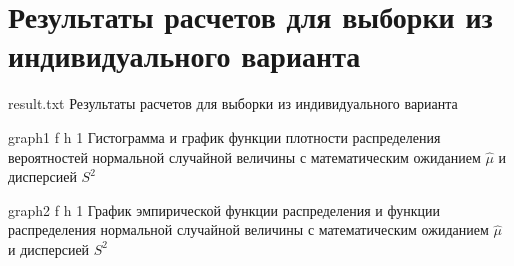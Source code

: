 \chapter{Результаты расчетов для выборки из индивидуального варианта}

{result.txt} %
{Результаты расчетов для выборки из индивидуального варианта} %

{graph1} %
{f} %
{h} %
{1\textwidth} %
{Гистограмма и график функции плотности распределения вероятностей нормальной случайной величины с математическим ожиданием $\hat{\mu}$ и дисперсией $S^2$} %

\clearpage

{graph2} %
{f} %
{h} %
{1\textwidth} %
{График эмпирической функции распределения и функции распределения нормальной случайной величины с математическим ожиданием $\hat{\mu}$ и дисперсией $S^2$} %